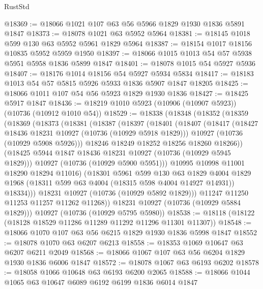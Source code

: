 \begin{lexlean}{RustStd}
\begin{coremodule}
@18369 := @18066 @1021 @107 @63 @56 @5966 @1829 @1930 @1836 @5891 @1847
@18373 := @18078 @1021 @63 @5952 @5964
@18381 := @18145 @1018 @599 @130 @63 @5952 @5961 @1829 @5964
@18387 := @18154 @1017 @18156 @10835 @5952 @5959 @1950
@18397 := @18066 @1015 @1013 @54 @57 @5938 @5951 @5958 @1836 @5899 @1847
@18401 := @18078 @1015 @54 @5927 @5936
@18407 := @18176 @1014 @18156 @54 @5927 @5934 @5834
@18417 := @18183 @1013 @54 @57 @5815 @5926 @5933 @1836 @5907 @1847 @18205
@18425 := @18066 @1011 @107 @54 @56 @5923 @1829 @1930 @1836
@18427 := @18425 @5917 @1847
@18436 := @18219 @1010 @5923 (@10906 (@10907 @5923)) (@10736 (@10912 @1010 @54))
@18529 := @18338
    (@18348
      (@18352
        (@18359
          (@18369
            (@18373
              (@18381
                (@18387
                  (@18397
                    (@18401
                      (@18407
                        (@18417
                          (@18427 @18436 @18231 @10927 (@10736 (@10929 @5918 @1829)))
                          @10927
                          (@10736 (@10929 @5908 @5926)))
                        @18246
                        @18249
                        @18252
                        @18256
                        @18260
                        @18266))
                    (@18425 @5944 @1847 @18436 @18231 @10927 (@10736 (@10929 @5945 @1829)))
                    @10927
                    (@10736 (@10929 @5900 @5951)))
                  @10995
                  @10998
                  @11001
                  @18290
                  @18294
                  @11016)
                (@18301
                  @5961
                  @599
                  @130
                  @63
                  @1829
                  @4004
                  @1829
                  @1968
                  (@18311 @599 @63 @4004 (@18315 @598 @4004 @14927 @14931))
                  @18334)))
            @18231
            @10927
            (@10736 (@10929 @5892 @1829)))
          @11247
          @11250
          @11253
          @11257
          @11262
          @11268))
      @18231
      @10927
      (@10736 (@10929 @5884 @1829)))
    @10927
    (@10736 (@10929 @5795 @5980))
@18538 := @18118 (@18122 (@18128 @18529 @11286 @11289 @11292 @11296 @11301 @11307))
@18548 := @18066 @1070 @107 @63 @56 @6215 @1829 @1930 @1836 @5998 @1847
@18552 := @18078 @1070 @63 @6207 @6213
@18558 := @18353 @1069 @10647 @63 @6207 @6211 @2049
@18568 := @18066 @1067 @107 @63 @56 @6204 @1829 @1930 @1836 @6006 @1847
@18572 := @18078 @1067 @63 @6193 @6202
@18578 := @18058 @1066 @10648 @63 @6193 @6200 @2065
@18588 := @18066 @1044 @1065 @63 @10647 @6089 @6192 @6199 @1836 @6014 @1847

\end{coremodule}
\end{lexlean}
